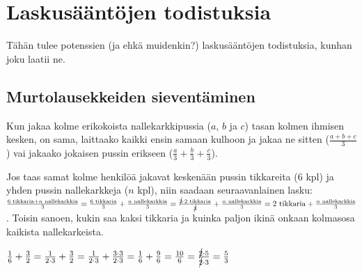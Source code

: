 \chapter{Laskusääntöjen todistuksia}
\label{pot_todistukset}
Tähän tulee potenssien (ja ehkä muidenkin?) laskusääntöjen todistuksia, kunhan joku laatii ne.

\section*{Murtolausekkeiden sieventäminen}


Kun jakaa kolme erikokoista nallekarkkipussia ($a$, $b$ ja $c$) tasan kolmen ihmisen kesken, on sama, laittaako kaikki ensin samaan kulhoon ja jakaa ne sitten ($\frac{a+b+c}{3}$) vai jakaako jokaisen pussin erikseen ($ \frac{a}{3} + \frac{b}{3} + \frac{c}{3}$).

Jos taas samat kolme henkilöä jakavat keskenään pussin tikkareita ($6$ kpl) ja yhden pussin nallekarkkeja ($n$ kpl), niin saadaan seuraavanlainen lasku: $ \frac{6\text{ tikkaria}+n\text{ nallekarkkia}}{3} = \frac{6\text{ tikkaria}}{3} + \frac{n\text{ nallekarkkia}}{3} = \frac{\cancel{3} \cdot 2\text{ tikkaria}}{\cancel{3}} + \frac{n\text{ nallekarkkia}}{3} = 2\text{ tikkaria} + \frac{n\text{ nallekarkkia}}{3}$. Toisin sanoen, kukin saa kaksi tikkaria ja kuinka paljon ikinä onkaan kolmasosa kaikista nallekarkeista.


\begin{esimerkki}

$ \frac{1}{6} + \frac{3}{2} = \frac{1}{2\cdot 3} + \frac{3}{2} = \frac{1}{2 \cdot 3} + \frac{3 \cdot 3}{2 \cdot 3} = \frac{1}{6} + \frac{9}{6} = \frac{10}{6} = \frac{\cancel{2} \cdot 5}{\cancel{2} \cdot 3} = \frac{5}{3}$

\end{esimerkki}



